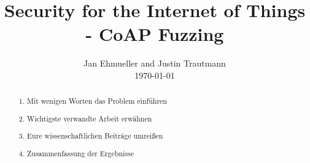 \documentclass[sigconf]{acmart}
\begin{document}
\title{Security for the Internet of Things - CoAP Fuzzing}

\author{Jan Ehmueller and Justin Trautmann \\ \today}

\begin{abstract}
\begin{enumerate}
	\item Mit wenigen Worten das Problem einführen
	\item Wichtigste verwandte Arbeit erwähnen
	\item Eure wissenschaftlichen Beiträge umreißen
	\item Zusammenfassung der Ergebnisse
\end{enumerate}
\end{abstract}

\maketitle

\glsresetall









\balance



\end{document}
